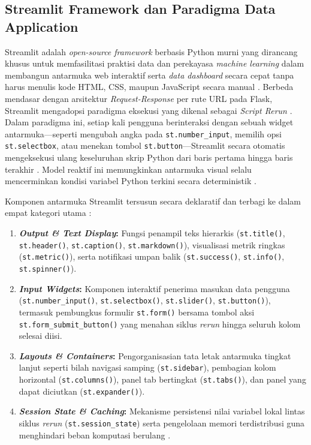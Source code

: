 \documentclass[a4paper,oneside,11pt]{book}
\begin{document}
\subsection{Streamlit Framework dan Paradigma Data Application}
\par Streamlit adalah \textit{open-source framework} berbasis Python murni yang dirancang khusus untuk memfasilitasi praktisi data dan perekayasa \textit{machine learning} dalam membangun antarmuka web interaktif serta \textit{data dashboard} secara cepat tanpa harus menulis kode HTML, CSS, maupun JavaScript secara manual \cite{streamlit_docs, treveil2020introducing}. Berbeda mendasar dengan arsitektur \textit{Request-Response} per rute URL pada Flask, Streamlit mengadopsi paradigma eksekusi yang dikenal sebagai \textit{Script Rerun} \cite{streamlit_execution_model}. Dalam paradigma ini, setiap kali pengguna berinteraksi dengan sebuah widget antarmuka---seperti mengubah angka pada \texttt{st.number\_input}, memilih opsi \texttt{st.selectbox}, atau menekan tombol \texttt{st.button}---Streamlit secara otomatis mengeksekusi ulang keseluruhan skrip Python dari baris pertama hingga baris terakhir \cite{streamlit_execution_model}. Model reaktif ini memungkinkan antarmuka visual selalu mencerminkan kondisi variabel Python terkini secara deterministik \cite{streamlit_execution_model, huyen2022designing}.
\par Komponen antarmuka Streamlit tersusun secara deklaratif dan terbagi ke dalam empat kategori utama \cite{streamlit_docs}:
\begin{enumerate}[label=\arabic*.]
  \item \textbf{\textit{Output \& Text Display}:} Fungsi penampil teks hierarkis (\texttt{st.title()}, \texttt{st.header()}, \texttt{st.caption()}, \texttt{st.markdown()}), visualisasi metrik ringkas (\texttt{st.metric()}), serta notifikasi umpan balik (\texttt{st.success()}, \texttt{st.info()}, \texttt{st.spinner()}).
  \item \textbf{\textit{Input Widgets}:} Komponen interaktif penerima masukan data pengguna (\texttt{st.number\_input()}, \texttt{st.selectbox()}, \texttt{st.slider()}, \texttt{st.button()}), termasuk pembungkus formulir \texttt{st.form()} bersama tombol aksi \texttt{st.form\_submit\_button()} yang menahan siklus \textit{rerun} hingga seluruh kolom selesai diisi.
  \item \textbf{\textit{Layouts \& Containers}:} Pengorganisasian tata letak antarmuka tingkat lanjut seperti bilah navigasi samping (\texttt{st.sidebar}), pembagian kolom horizontal (\texttt{st.columns()}), panel tab bertingkat (\texttt{st.tabs()}), dan panel yang dapat diciutkan (\texttt{st.expander()}).
  \item \textbf{\textit{Session State \& Caching}:} Mekanisme persistensi nilai variabel lokal lintas siklus \textit{rerun} (\texttt{st.session\_state}) serta pengelolaan memori terdistribusi guna menghindari beban komputasi berulang \cite{streamlit_execution_model, streamlit_caching}.
\end{enumerate}
\end{document}

